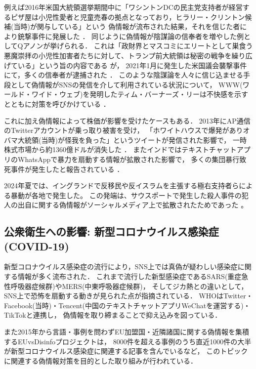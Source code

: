 例えば2016年米国大統領選挙期間中に「ワシントンDCの民主党支持者が経営するピザ屋は小児性愛者と児童売春の拠点となっており，ヒラリー・クリントン候補(当時)が関与している」という
偽情報が流布された結果，それを信じた者により銃撃事件に発展した \cite{agencies_2016}．
同じように偽情報が陰謀論の信奉者を増やした例としてQアノンが挙げられる．
これは「政財界とマスコミにエリートとして巣食う悪魔崇拝の小児性加害者たちに対して、トランプ前大統領は秘密の戦争を繰り広げている」という旨の内容である \cite{wendling_2021}が，
2021年1月に発生した米国議会襲撃事件にて，多くの信奉者が逮捕された \cite{hymes_mcdonald_watson_2021}．
このような陰謀論を人々に信じ込ませる手段として偽情報がSNSの発信を介して利用されている状況について，
WWW(ワールド・ワイド・ウェブ)を発明したティム・バーナーズ・リーは不快感を示すとともに対策を呼びかけている \cite{reklaitis_2018}．

これに加え偽情報によって株価が影響を受けたケースもある．
2013年にAP通信のTwitterアカウントが乗っ取り被害を受け，
「ホワイトハウスで爆発がありオバマ大統領(当時)が怪我を負った」というツイートが発信された影響で，
一時株式市場から約1360億ドルが消失した \cite{fisher_2013}．
またインドではテキストチャットアプリのWhatsAppで暴力を扇動する情報が拡散された影響で，
多くの集団暴行致死事件が発生したと報告されている \cite{frayer_2018}．

2024年夏では、イングランドで反移民や反イスラムを主張する極右支持者らによる暴動が各地で発生した。
この発端は、サウスポートで発生した殺人事件の犯人の出自に関する偽情報がソーシャルメディア上で拡散されたためであった \cite{Spring_2024}。

\subsection{公衆衛生への影響: 新型コロナウイルス感染症(COVID-19)}
新型コロナウイルス感染症の流行により，SNS上では真偽が疑わしい感染症に関する情報が多く流布された．
これまで流行した新型感染症であるSARS(重症急性呼吸器症候群)やMERS(中東呼吸器症候群)，
そしてジカ熱との違いとして，SNS上で恐怖を扇動する動きが見られた点が指摘されている．
WHOはTwitter・Facebook(当時)・Tencent(中国のテキストチャットアプリWeChatを運営する)・TikTokと連携し，
偽情報を取り締まることで抑え込みを図っている\cite{hao_2020}．

また2015年から言語・事例を問わずEU加盟国・近隣諸国に関する偽情報を集積するEUvsDisinfoプロジェクト\cite{euvsdisinfo_2020}は，
8000件を超える事例のうち直近1000件の大半が新型コロナウイルス感染症に関連する記事を含んでいる\cite{euvsdisinfo_2020_2}など，
このトピックに関連する偽情報対策を目的とした取り組みが行われている．


